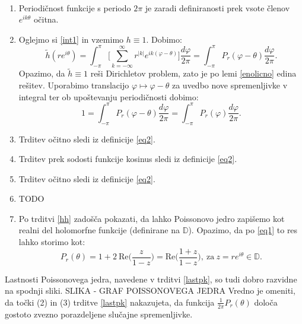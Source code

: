 \documentclass[mat1]{fmfdelo}
\begin{document}
    \begin{dokaz}
        $ $
        \begin{enumerate}
            \item Periodičnost funkcije s periodo $2\pi$ je zaradi definiranosti prek vsote členov $e^{ik\theta}$ očitna. 
            \item Oglejmo si \ref{int1} in vzemimo $h \equiv 1$. Dobimo: 
            $$
                \widetilde{h}(r e^{i \theta}) = \int_{-\pi}^{\pi}{\bigg[\sum_{k=-\infty}^{\infty}{r^{|k|} e^{ik(\varphi - \theta)}}\bigg] \frac{d \varphi}{2 \pi}} = \int_{-\pi}^{\pi}{P_r(\varphi - \theta)\frac{d \varphi}{2 \pi}}. 
            $$
            Opazimo, da $\widetilde{h} \equiv 1$ reši Dirichletov problem, zato je po lemi \ref{enolicno} edina rešitev. Uporabimo translacijo $\varphi \mapsto \varphi - \theta$ za uvedbo nove spremenljivke v integral ter ob upoštevanju periodičnosti dobimo:
            $$
                1 = \int_{-\pi}^{\pi}{P_r(\varphi - \theta)\frac{d \varphi}{2 \pi}} = \int_{-\pi}^{\pi}{P_r(\varphi)\frac{d \varphi}{2 \pi}}.
            $$
            \item Trditev očitno sledi iz definicije \ref{eq2}. 
            \item Trditev prek sodosti funkcije kosinus sledi iz definicije \ref{eq2}. 
            \item Trditev očitno sledi iz definicije \ref{eq2}.
            \item TODO 
            \item Po trditvi \ref{hh} zadošča pokazati, da lahko Poissonovo jedro zapišemo kot realni del holomorfne funkcije (definirane na $\mathbb{D}$). Opazimo, da po \ref{eq1} to res lahko storimo kot:
            $$
                P_r(\theta) = 1 + 2~\text{Re}\bigg(\frac{z}{1-z}\bigg) = \text{Re}\bigg(\frac{1+z}{1-z}\bigg),~\text{za}~z= re^{i\theta} \in \mathbb{D}.
            $$
        \end{enumerate}
    \end{dokaz}
    \begin{opomba}
        Lastnosti Poissonovega jedra, navedene v trditvi \ref{lastpk}, so tudi dobro razvidne na spodnji sliki. 
        \newline
        SLIKA - GRAF POISSONOVEGA JEDRA
        \newline
        Vredno je omeniti, da točki (2) in (3) trditve \ref{lastpk} nakazujeta, da funkcija $\frac{1}{2 \pi} P_r(\theta)$ določa gostoto zvezno porazdeljene slučajne spremenljivke.
    \end{opomba}
\end{document}
